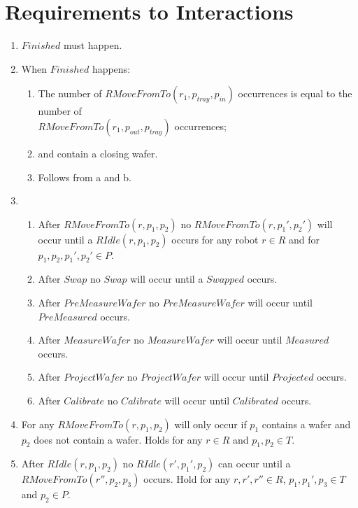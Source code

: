 \section{Requirements to Interactions}

\begin{enumerate}
    \item $\mathit{Finished}$ must happen.

    \item When $\mathit{Finished}$ happens:
    \begin{enumerate}
        \item The number of $\mathit{RMoveFromTo}(r_1, p_\mathit{tray}, p_\mathit{in})$ occurrences is equal to the number of \\$\mathit{RMoveFromTo}(r_1, p_\mathit{out}, p_\mathit{tray})$ occurrences;
        \item \chuckMeas and \chuckProj contain a closing wafer.
        \item Follows from a and b.
    \end{enumerate}

    \item \begin{enumerate}
        \item After $\mathit{RMoveFromTo}(r, p_1, p_2)$ no $\mathit{RMoveFromTo}(r, p_1', p_2')$ will occur until a $\mathit{RIdle}(r, p_1,p_2)$ occurs for any robot $r \in R$ and for $p_1, p_2, p_1',p_2' \in P$.
        \item After $\mathit{Swap}$ no $\mathit{Swap}$ will occur until a $\mathit{Swapped}$ occurs.
        \item After $\mathit{PreMeasureWafer}$ no $\mathit{PreMeasureWafer}$ will occur until $\mathit{PreMeasured}$ occurs.
        \item After $\mathit{MeasureWafer}$ no $\mathit{MeasureWafer}$ will occur until $\mathit{Measured}$ occurs.
        \item After $\mathit{ProjectWafer}$ no $\mathit{ProjectWafer}$ will occur until $\mathit{Projected}$ occurs.
        \item After $\mathit{Calibrate}$ no $\mathit{Calibrate}$ will occur until $\mathit{Calibrated}$ occurs.
    \end{enumerate}

    \item For any $RMoveFromTo(r, p_1, p_2)$ will only occur if $p_1$ contains a wafer and $p_2$ does not contain a wafer. Holds for any $r \in R$ and $p_1,p_2 \in T$.
    \item After $RIdle(r, p_1, p_2)$ no $RIdle(r', p_1', p_2)$ can occur until a $RMoveFromTo(r'',p_2,p_3)$ occurs. Hold for any $r, r',r''\in R$, $p_1,p_1',p_3 \in T$ and $p_2 \in P$.


\end{enumerate}
